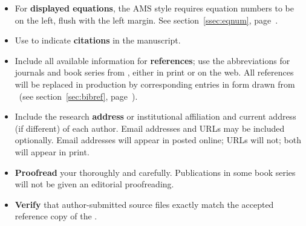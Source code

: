 \begin{itemize}
\item For \textbf{displayed equations}, the AMS style requires equation numbers
 to be on the left, flush with the left margin. See
 section~\ref{ssec:eqnum}, page~\pageref{ssec:eqnum}.

\item Use  to indicate \textbf{citations} in the manuscript.

\item Include all available information for \textbf{references}; use the
 abbreviations for journals and book series from \cite{ABMR}, either in
 print or on the web.
\ifmonograph
\else
 All references will be replaced in production by corresponding entries
 in  form drawn from \MSN\ (see section~\ref{sec:bibref},
 page~\pageref{sec:bibref}).
\fi

\item Include the research \textbf{address} or institutional affiliation
 and current address (if different) of each author.  Email addresses
 and URLs may be included optionally.  Email addresses will appear in
 posted online; URLs will not; both will appear in print.

\item \textbf{Proofread} your 
 thoroughly and carefully.
\ifjournal
\else
 Publications in
 \ifmemoirs
  \Memos{}
 \else
  some book series
 \fi
 will not be given an editorial proofreading.
\fi

\item \textbf{Verify} that author-submitted source files exactly match
 the accepted reference copy of the
 .

\end{itemize}




